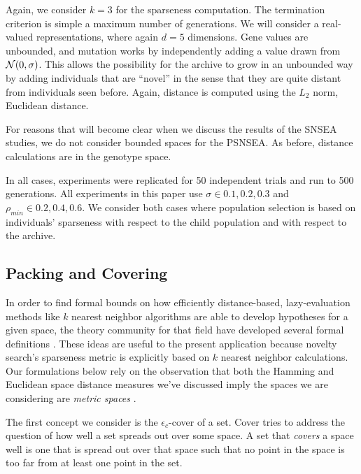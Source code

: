 \documentclass[twoside]{article}
\begin{document}
Again, we consider $k=3$ for the sparseness computation.  The termination criterion is simple a maximum number of generations.  We will consider a real-valued representations, where again $d=5$ dimensions.  Gene values are unbounded, and mutation works by independently adding a value drawn from ${\cal N}(0,\sigma)$.  This allows the possibility for the archive to grow in an unbounded way by adding individuals that are ``novel'' in the sense that they are quite distant from individuals seen before.  Again, distance is computed using the $L_2$ norm, Euclidean distance.

For reasons that will become clear when we discuss the results of the SNSEA studies, we do not consider bounded spaces for the PSNSEA.  As before, distance calculations are in the genotype space.

In all cases, experiments were replicated for 50 independent trials and run to 500 generations. All experiments in this paper use $\sigma\in{0.1,0.2,0.3}$ and $\rho_{min} \in {0.2,0.4,0.6}$.  We consider both cases where population selection is based on individuals' sparseness with respect to the child population and with respect to the archive.


\subsection{Packing and Covering}
\label{subsec:knn}

In order to find formal bounds on how efficiently distance-based, lazy-evaluation methods like $k$ nearest neighbor algorithms are able to develop hypotheses for a given space, the theory community for that field have developed several formal definitions \citep{Clarkson1999dcg}.  These ideas are useful to the present application because novelty search's sparseness metric is explicitly based on $k$ nearest neighbor calculations.  Our formulations below rely on the observation that both the Hamming and Euclidean space distance measures we've discussed imply the spaces we are considering are \emph{metric spaces} \citep{Bryant1985}.

The first concept we consider is the $\epsilon_c$-cover of a set.  Cover tries to address the question of how well a set spreads out over some space.  A set that \emph{covers} a space well is one that is spread out over that space such that no point in the space is too far from at least one point in the set.
\end{document}
